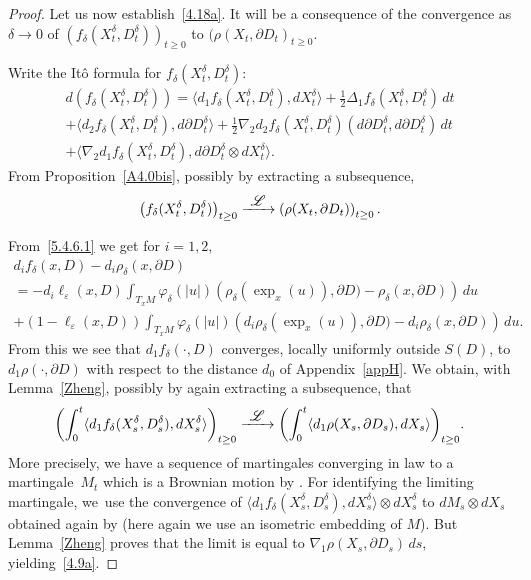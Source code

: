 \documentclass[10pt]{amsart}
\newcommand\To[1]{\mathchoice{\xrightarrow{\textstyle\kern4pt#1\kern3pt}}{\stackrel{#1}{\longrightarrow}}{}{}}
\theoremstyle{plain}
\theoremstyle{definition}
\newcommand{\SL}{{\mathscr L}}
\let\f\frac
\let\d\delta
\let\e\varepsilon
\let\n\nabla
\begin{document}
\begin{proof}
Let us now establish~\eqref{4.18a}. It will be a consequence of the convergence as $\d\to 0$ of $(f_\d(X_t^\d, D_t^\d))_{t\ge 0}$ to $(\rho(X_t,\partial D_t)_{t\ge 0}$.

Write the Itô formula for $f_\d(X_t^\d, D_t^\d)$:
\begin{multline}
\label{4.14bis}
d\left(f_\d(X_t^\d, D_t^\d)\right)=\langle d_1f_\d(X_t^\d, D_t^\d), dX_t^\d\rangle +\f12\Delta_1f_\d(X_t^\d, D_t^\d)\,dt\\
+\langle d_2f_\d(X_t^\d, D_t^\d), d\partial D_t^\d\rangle +\f12\n_2d_2f_\d(X_t^\d, D_t^\d)(d\partial D_t^\d,d\partial D_t^\d)\,dt\\
+\langle \n_2 d_1f_\d(X_t^\d, D_t^\d), d\partial D_t^\d \otimes dX_t^\d\rangle.
\end{multline}
From Proposition~\ref{A4.0bis}, possibly by extracting a subsequence,
\begin{equation}
\label{4.8}
\left(f_\d(X_t^\d, D_t^\d)\right)_{t\ge 0}\To{\SL}\left(\rho(X_t, \partial D_t)\right)_{t\ge 0}.
\end{equation}

From~\eqref{5.4.6.1} we get for $i=1,2$,
\begin{multline}
d_if_\d(x,D)-d_i\rho_\d(x,\partial D)\\
=-d_i\ell_\e(x,D)\int_{T_xM}\varphi_\d(\vert u\vert )\left(\rho_\d(\exp_x(u)),\partial D)-\rho_\d(x,\partial D)\right)\, du\\
+(1-\ell_\e(x,D))\int_{T_xM}\varphi_\d(\vert u\vert )\left(d_i\rho_\d(\exp_x(u)),\partial D)-d_i\rho_\d(x,\partial D)\right)\, du.
\end{multline}
From this we see that $d_1f_\d(\cdot, D)$ converges, locally uniformly outside $S(D)$, to $d_1\rho(\cdot, \partial D)$ with respect to the distance $d_0$ of Appendix~\ref{appH}. We obtain, with Lemma~\ref{Zheng}, possibly by again extracting a subsequence, that
\begin{equation}
\label{4.9a}
\biggl(\int_0^t\langle d_1f_\d(X_s^\d, D_s^\d), dX_s^\d\rangle\biggr)_{t\ge 0}\To{\SL}\biggl(\int_0^t\langle d_1\rho (X_s,\partial D_s), dX_s\rangle\biggr)_{t\ge 0}.
\end{equation}
More precisely, we have a sequence of martingales converging in law to a martingale~$M_t$ which is a Brownian motion by \cite[Th.\,3]{Zheng:85}. For identifying the limiting martingale, we~use the convergence of $\langle d_1f_\d(X_s^\d, D_s^\d), dX_s^\d\rangle\otimes dX_s^\d$ to $ dM_s\otimes dX_s$ obtained again by \cite[Th.\,3]{Zheng:85} (here again we use an isometric embedding of $M$). But Lemma~\ref{Zheng} proves that the limit is equal to $\n_1\rho (X_s,\partial D_s)\, ds$, yielding~\eqref{4.9a}.


\end{proof}
\end{document}
